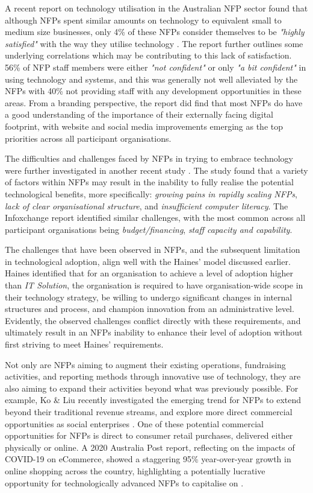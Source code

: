 A recent report on technology utilisation in the Australian NFP sector found that although NFPs spent similar amounts on technology to equivalent small to medium size businesses, only 4\% of these NFPs consider themselves to be \emph{"highly satisfied"} with the way they utilise technology \cite{infoxchange_2019}. The report further outlines some underlying correlations which may be contributing to this lack of satisfaction. 56\% of NFP staff members were either \emph{"not confident"} or only \emph{"a bit confident"} in using technology and systems, and this was generally not well alleviated by the NFPs with 40\% not providing staff with any development opportunities in these areas. From a branding perspective, the report did find that most NFPs do have a good understanding of the importance of their externally facing digital footprint, with website and social media improvements emerging as the top priorities across all participant organisations.

The difficulties and challenges faced by NFPs in trying to embrace technology were further investigated in another recent study \cite{le2008view}. The study found that a variety of factors within NFPs may result in the inability to fully realise the potential technological benefits, more specifically: \emph{growing pains in rapidly scaling NFPs}, \emph{lack of clear organisational structure}, and \emph{insufficient computer literacy}. The Infoxchange report identified similar challenges, with the most common across all participant organisations being \emph{budget/financing}, \emph{staff capacity and capability}.

The challenges that have been observed in NFPs, and the subsequent limitation in technological adoption, align well with the Haines' model discussed earlier. Haines identified that for an organisation to achieve a level of adoption higher than \emph{IT Solution}, the organisation is required to have organisation-wide scope in their technology strategy, be willing to undergo significant changes in internal structures and process, and champion innovation from an administrative level. Evidently, the observed challenges conflict directly with these requirements, and ultimately result in an NFPs inability to enhance their level of adoption without first striving to meet Haines' requirements.

Not only are NFPs aiming to augment their existing operations, fundraising activities, and reporting methods through innovative use of technology, they are also aiming to expand their activities beyond what was previously possible. For example, Ko \& Liu recently investigated the emerging trend for NFPs to extend beyond their traditional revenue streams, and explore more direct commercial opportunities as social enterprises \cite{ko2020transformation}. One of these potential commercial opportunities for NFPs is direct to consumer retail purchases, delivered either physically or online. A 2020 Australia Post report, reflecting on the impacts of COVID-19 on eCommerce, showed a staggering 95\% year-over-year growth in online shopping across the country, highlighting a potentially lucrative opportunity for technologically advanced NFPs to capitalise on \cite{auspost2020}.

